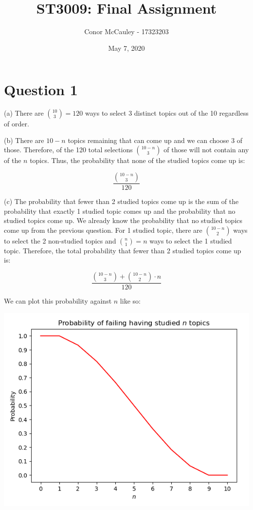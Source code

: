 \documentclass[10pt]{article}
\title{\vspace{-5ex}ST3009: Final Assignment\vspace{-2.5ex}}
\author{Conor McCauley - 17323203}
\date{\vspace{-2ex}May 7, 2020\vspace{-2ex}}
\begin{document}
\maketitle

\section*{Question 1}

\noindent (a) There are ${10 \choose 3} = 120$ ways to select 3 distinct topics out of the 10 regardless of order.

\noindent (b) There are $10 - n$ topics remaining that can come up and we can choose 3 of those. Therefore, of the 120 total selections ${10 - n \choose 3}$ of those will not contain any of the $n$ topics. Thus, the probability that none of the studied topics come up is:

$$\frac{{10 - n \choose 3}}{120}$$

\noindent (c) The probability that fewer than 2 studied topics come up is the sum of the probability that exactly 1 studied topic comes up and the probability that no studied topics come up. We already know the probability that no studied topics come up from the previous question. For 1 studied topic, there are ${10 - n \choose 2}$ ways to select the 2 non-studied topics and ${n \choose 1} = n$ ways to select the 1 studied topic. Therefore, the total probability that fewer than 2 studied topics come up is:

$$\frac{{10 - n \choose 3} + {{10 - n \choose 2} \cdot n}}{120}$$

We can plot this probability against $n$ like so:

\begin{center}
    \includegraphics[scale=0.5]{q1_c.png}
\end{center}
\end{document}
